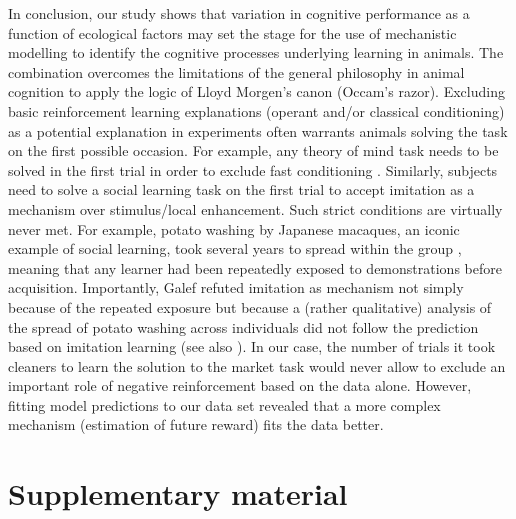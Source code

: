 \documentclass[]{rsos}%
\newcommand{\beginsupplement}{ \setcounter{table}{0}     \renewcommand{\thetable}{S\arabic{table}}\setcounter{figure}{0} \renewcommand{\thefigure}{S\arabic{figure}}}
\begin{document}
In conclusion, our study shows that variation in cognitive performance as
a function of ecological factors may set the stage for the use of
mechanistic modelling to identify the cognitive processes underlying
learning in animals. The combination overcomes the limitations
of the general philosophy in animal cognition to apply the logic of
Lloyd Morgen's canon (Occam's razor). Excluding basic
reinforcement learning explanations (operant and/or classical conditioning)
as a potential explanation in experiments
often warrants animals solving the task on the first possible occasion.
For example, any theory of mind task needs to be solved in the first
trial in order to exclude fast conditioning \citep{heyes_Theory_1998}.
Similarly, subjects need to solve a social learning task on the first
trial to accept imitation as a mechanism over stimulus/local
enhancement. Such strict conditions are virtually never met. For
example, potato washing by Japanese macaques, an iconic example of
social learning, took several years to spread within the group
\citep{kawamura_Process_1959}, meaning that any learner had been repeatedly
exposed to demonstrations before acquisition. Importantly, Galef
\citep{galef_Question_1992} refuted imitation as mechanism not simply because
of the repeated exposure but because a (rather qualitative) analysis of
the spread of potato washing across individuals did not follow the
prediction based on imitation learning (see also
\citep{hirata_SweetPotato_2001}). In our case, the number of trials it took
cleaners to learn the solution to the market task would never allow to
exclude an important role of negative reinforcement based on the data
alone. However, fitting model predictions to our data set revealed that
a more complex mechanism (estimation of future reward) fits the data
better.

\newpage

\hypertarget{supplementary-material}{%
\section{Supplementary material}\label{supplementary-material}}

\beginsupplement
\end{document}
